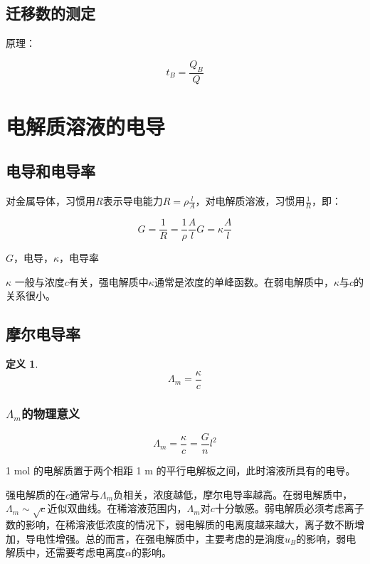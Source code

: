 \documentclass[a4paper]{ctexrep}
\newcommand{\mol}{\mathrm{mol}}
\newtheorem{definition}{定义}[chapter]
\begin{document}
        \subsection{迁移数的测定}

        原理：

        \[
            t_B = \frac{Q_B}{Q}  
        \]
        \section{电解质溶液的电导}

        \subsection{电导和电导率}

        对金属导体，习惯用$R$表示导电能力$R = \rho \frac{l}{A}$，对电解质溶液，习惯用$\frac{1}{R}$，即：
        
        \[
            G = \frac{1}{R} = \frac{1}{\rho}\frac{A}{l} G = \kappa \frac{A}{l}  
        \]

        $G$，电导，$\kappa$，电导率

        $\kappa$ 一般与浓度$c$有关，强电解质中$\kappa$通常是浓度的单峰函数。在弱电解质中，$\kappa$与$c$的关系很小。

        \subsection{摩尔电导率}

        \begin{definition}
            \[
                \varLambda_m = \frac{\kappa}{c} 
            \]
        \end{definition}

        \subsubsection{$\varLambda_m$的物理意义}

        \[
            \varLambda_m = \frac{\kappa}{c} = \frac{G}{n}l^2  
        \]

        1 $\mol$ 的电解质置于两个相距 1 $\mathrm{m}$ 的平行电解板之间，此时溶液所具有的电导。

        强电解质的在$c$通常与$\varLambda_m$负相关，浓度越低，摩尔电导率越高。在弱电解质中，$\varLambda_m \sim \sqrt{c}$近似双曲线。在稀溶液范围内，$\varLambda_m$对$c$十分敏感。弱电解质必须考虑离子数的影响，在稀溶液低浓度的情况下，弱电解质的电离度越来越大，离子数不断增加，导电性增强。总的而言，在强电解质中，主要考虑的是淌度$u_B$的影响，弱电解质中，还需要考虑电离度$\alpha$的影响。
\end{document}
